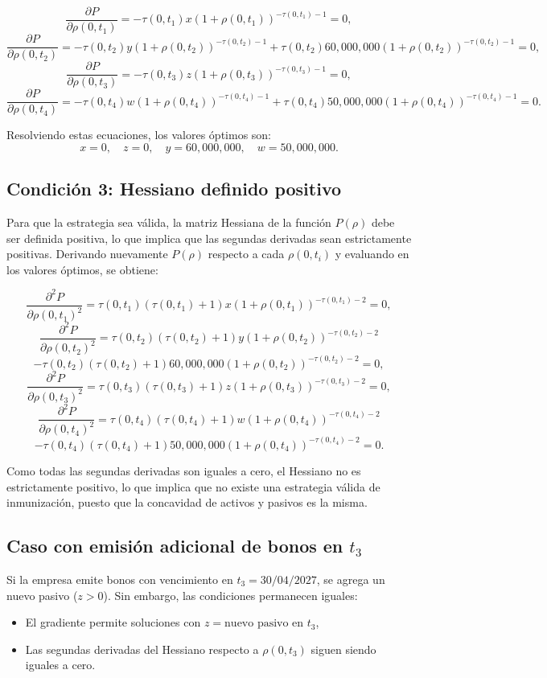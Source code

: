 \[
\frac{\partial P}{\partial \rho(0,t_1)} = -\tau(0,t_1)x(1 + \rho(0,t_1))^{-\tau(0,t_1)-1} = 0,
\]
\[
\frac{\partial P}{\partial \rho(0,t_2)} = -\tau(0,t_2)y(1 + \rho(0,t_2))^{-\tau(0,t_2)-1} + \tau(0,t_2)60,000,000(1 + \rho(0,t_2))^{-\tau(0,t_2)-1} = 0,
\]
\[
\frac{\partial P}{\partial \rho(0,t_3)} = -\tau(0,t_3)z(1 + \rho(0,t_3))^{-\tau(0,t_3)-1} = 0,
\]
\[
\frac{\partial P}{\partial \rho(0,t_4)} = -\tau(0,t_4)w(1 + \rho(0,t_4))^{-\tau(0,t_4)-1} + \tau(0,t_4)50,000,000(1 + \rho(0,t_4))^{-\tau(0,t_4)-1} = 0.
\]

Resolviendo estas ecuaciones, los valores óptimos son:
\[
x = 0, \quad z = 0, \quad y = 60,000,000, \quad w = 50,000,000.
\]

\subsection*{Condición 3: Hessiano definido positivo}
Para que la estrategia sea válida, la matriz Hessiana de la función \(P(\rho)\) debe ser definida positiva, lo que implica que las segundas derivadas sean estrictamente positivas. Derivando nuevamente \(P(\rho)\) respecto a cada \(\rho(0,t_i)\) y evaluando en los valores óptimos, se obtiene:

\[
\frac{\partial^2 P}{\partial \rho(0,t_1)^2} = \tau(0,t_1)(\tau(0,t_1)+1)x(1 + \rho(0,t_1))^{-\tau(0,t_1)-2} = 0,
\]
\[
\frac{\partial^2 P}{\partial \rho(0,t_2)^2} = \tau(0,t_2)(\tau(0,t_2)+1)y(1 + \rho(0,t_2))^{-\tau(0,t_2)-2} 
\]
\[
- \tau(0,t_2)(\tau(0,t_2)+1)60,000,000(1 + \rho(0,t_2))^{-\tau(0,t_2)-2} = 0,
\]
\[
\frac{\partial^2 P}{\partial \rho(0,t_3)^2} = \tau(0,t_3)(\tau(0,t_3)+1)z(1 + \rho(0,t_3))^{-\tau(0,t_3)-2} = 0,
\]
\[
\frac{\partial^2 P}{\partial \rho(0,t_4)^2} = \tau(0,t_4)(\tau(0,t_4)+1)w(1 + \rho(0,t_4))^{-\tau(0,t_4)-2} 
\]
\[
- \tau(0,t_4)(\tau(0,t_4)+1)50,000,000(1 + \rho(0,t_4))^{-\tau(0,t_4)-2} = 0.
\]

Como todas las segundas derivadas son iguales a cero, el Hessiano no es estrictamente positivo, lo que implica que no existe una estrategia válida de inmunización, puesto que la concavidad de activos y pasivos es la misma.

\subsection*{Caso con emisión adicional de bonos en \(t_3\)}
Si la empresa emite bonos con vencimiento en \(t_3 = 30/04/2027\), se agrega un nuevo pasivo (\(z > 0\)). Sin embargo, las condiciones permanecen iguales:
\begin{itemize}
    \item El gradiente permite soluciones con \(z = \text{nuevo pasivo en } t_3\),
    \item Las segundas derivadas del Hessiano respecto a \(\rho(0,t_3)\) siguen siendo iguales a cero.
\end{itemize}

